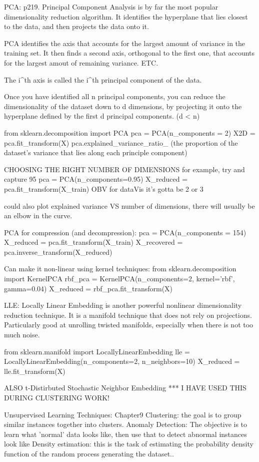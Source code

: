 PCA: p219.
Principal Component Analysis is by far the most popular dimensionality reduction algorithm.
It identifies the hyperplane that lies closest to the data,
and then projects the data onto it.

PCA identifies the axis that accounts for the largest amount of variance in the training set.
It then finds a second axis, orthogonal to the first one,
that accounts for the largest amout of remaining variance. ETC.

The i^th axis is called the i^th principal component of the data.

Once you have identified all n principal components,
you can reduce the dimensionality of the dataset down to d dimensions,
by projecting it onto the hyperplane defined by the first d principal components. (d < n)

from sklearn.decomposition import PCA
pca = PCA(n_components = 2)
X2D = pca.fit_transform(X)
pca.explained_variance_ratio_ (the proportion of the dataset's variance that lies along each principle component)

CHOOSING THE RIGHT NUMBER OF DIMENSIONS
for example, try and capture 95%
pca = PCA(n_components=0.95)
X_reduced = pca.fit_transform(X_train)
OBV for dataVis it's gotta be 2 or 3

could also plot explained variance VS number of dimensions,
there will usually be an elbow in the curve.

PCA for compression (and decompression):
pca = PCA(n_components = 154)
X_reduced = pca.fit_transform(X_train)
X_recovered = pca.inverse_transform(X_reduced)

Can make it non-linear using kernel techniques:
from sklearn.decomposition import KernelPCA
rbf_pca = KernelPCA(n_components=2, kernel='rbf', gamma=0.04)
X_reduced = rbf_pca.fit_transform(X)

LLE: Locally Linear Embedding
is another powerful nonlinear dimensionality reduction technique.
It is a manifold technique that does not rely on projections.
Particularly good at unrolling twisted manifolds, especially when there is not too much noise.

from sklearn.manifold import LocallyLinearEmbedding
lle = LocallyLinearEmbedding(n_components=2, n_neighbors=10)
X_reduced = lle.fit_transform(X)

ALSO t-Distirbuted Stochastic Neighbor Embedding
*** I HAVE USED THIS DURING CLUSTERING WORK!

Unsupervised Learning Techniques: Chapter9
Clustering: the goal is to group similar instances together into clusters.
Anomaly Detection: The objective is to learn what 'normal' data looks like,
then use that to detect abnormal instances look like
Density estimation: this is the task of estimating the probability density function of the random process generating the dataset..

